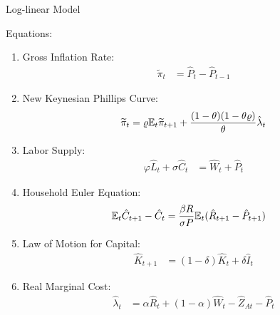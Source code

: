 \documentclass[
presentation.tex
]{subfiles}
\begin{document}
\begin{frame}[allowframebreaks]{Log-linear Model}
	
	Equations:	
	
	\begin{enumerate}
		
		\item Gross Inflation Rate:
		\begin{align}
			\widetilde{\pi}_t &= \hat{P}_t - \hat{P}_{t-1}
		\end{align}
		
		\item New Keynesian Phillips Curve:
		\begin{align}
			\widetilde{\pi}_t = \varrho {\mathbb{E}_{t}} \widetilde{\pi}_{t+1} + \frac{(1-\theta) (1- \theta \varrho)}{\theta} \hat{\lambda}_t
		\end{align}
		
		\item Labor Supply:
		\begin{align}
			\varphi \hat{L}_t + \sigma \hat{C}_t &= \hat{W}_t + \hat{P}_t
		\end{align}
		
		\item Household Euler Equation:
		\begin{align}
			{\mathbb{E}_{t}} \hat{C}_{t+1} - \hat{C}_t &= \frac{\beta R}{\sigma P} {\mathbb{E}_{t}}(\hat{R}_{t+1} - \hat{P}_{t+1})
		\end{align}
		
		\item Law of Motion for Capital:
		\begin{align}
			\hat{K}_{t+1} &= (1-\delta)\hat{K}_t + \delta \hat{I}_t
		\end{align}
		
		
		\item Real Marginal Cost:
		\begin{align}
			\hat{\lambda}_t &= \alpha \hat{R}_t + (1- \alpha) \hat{W}_t - \hat{Z}_{At} - \hat{P}_t %
		\end{align}
		

\end{enumerate}
\end{frame}
\end{document}

